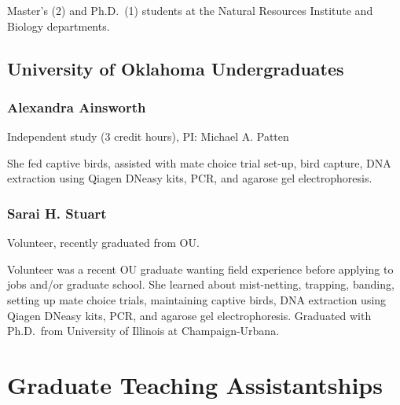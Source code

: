 \documentclass[
  letterpaper,
  DIV=11,
  numbers=noendperiod,
  oneside]{scrreprt}
\begin{document}

Master's (2) and Ph.D.~(1) students at the Natural Resources Institute
and Biology departments.

\subsection{University of Oklahoma
Undergraduates}\label{university-of-oklahoma-undergraduates}

\subsubsection{Alexandra Ainsworth}\label{alexandra-ainsworth}

Independent study (3 credit hours), PI: Michael A. Patten


She fed captive birds, assisted with mate choice trial set-up, bird
capture, DNA extraction using Qiagen DNeasy kits, PCR, and agarose gel
electrophoresis.

\subsubsection{Sarai H. Stuart}\label{sarai-h.-stuart}

Volunteer, recently graduated from OU.


Volunteer was a recent OU graduate wanting field experience before
applying to jobs and/or graduate school. She learned about mist-netting,
trapping, banding, setting up mate choice trials, maintaining captive
birds, DNA extraction using Qiagen DNeasy kits, PCR, and agarose gel
electrophoresis. Graduated with Ph.D.~from University of Illinois at
Champaign-Urbana.

\section{Graduate Teaching
Assistantships}\label{graduate-teaching-assistantships}
\end{document}
